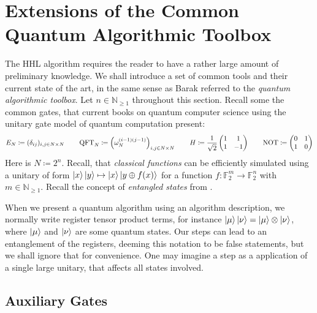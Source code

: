 \section{Extensions of the Common Quantum Algorithmic Toolbox} \label{extensions_of_the_common_quantum_algorithmic_toolbox}

The HHL algorithm requires the reader to have a rather large amount of preliminary knowledge. We shall introduce a set of common tools and their current state of the art, in the same sense as Barak \cite[p. 415]{Barak2007} referred to the \emph{quantum algorithmic toolbox}. Let \(n \in \mathbb{N}_{\geq 1}\) throughout this section. Recall some the common gates, that current books \cite{Homeister2018, Nielsen2010,Scherer2019} on quantum computer science using the unitary gate model of quantum computation present:
\begin{align}
    E_N \coloneqq (\delta_{ij})_{i, j \in N \times N} \qquad \operatorname{QFT}_N \coloneqq \left(\omega_N^{(i-1)(j-1)}\right)_{i, j \in N \times N} \qquad H \coloneqq \frac{1}{\sqrt{2}} \begin{pmatrix}
        1 & 1\\
        1 & -1
    \end{pmatrix} \qquad \operatorname{NOT} \coloneqq \begin{pmatrix}
        0 & 1\\
        1 & 0
    \end{pmatrix}
\end{align}
Here is \(N \coloneqq 2^n\). Recall, that \emph{classical functions} can be efficiently simulated using a unitary of form \(\ket{x}\ket{y} \mapsto \ket{x}\ket{y \oplus f(x)}\) for a function \(f\colon \mathbb{F}_2^m \to \mathbb{F}_2^n\) with \(m \in \mathbb{N}_{\geq 1}\). Recall the concept of \emph{entangled states} from \cite[p. 95-96]{Nielsen2010}.

\begin{remark}
    When we present a quantum algorithm using an algorithm description, we normally write register tensor product terms, for instance \(\ket{\mu} \ket{\nu} = \ket{\mu} \otimes \ket{\nu}\), where \(\ket{\mu}\) and \(\ket{\nu}\) are some quantum states. Our steps can lead to an entanglement of the registers, deeming this notation to be false statements, but we shall ignore that for convenience. One may imagine a step as a application of a single large unitary, that affects all states involved.
\end{remark}

\subsection{Auxiliary Gates }


